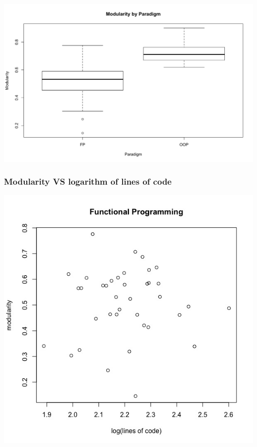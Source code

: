 \documentclass[12pt, a4paper]{article}
\begin{document}
\begin{minipage}[t]{\linewidth}
    \includegraphics[width=\textwidth]{modularity_paradigm.png}
    \captionsetup{type=figure}
    \label{fig:modularity_paradigm}
  \end{minipage}


\subsubsection{Modularity VS logarithm of lines of code}


\begin{minipage}[t]{\linewidth}
    \includegraphics[width=\textwidth]{images/fp_lines_code_vs_modularity.jpeg}
    \captionsetup{type=figure}
    \label{fig:fp_log_lines_mod}
  \end{minipage}
  
\end{document}
